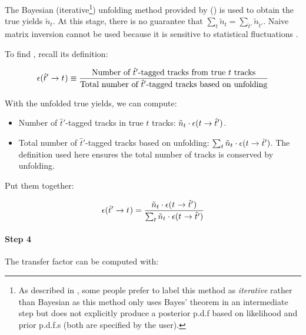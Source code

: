 The Bayesian (iterative\footnote{
    As described in \cite{StatisticalMethods},
    some people prefer to label this method as \emph{iterative} rather
    than Bayesian as this method only uses Bayes' theorem in an intermediate
    step but does not explicitly produce a posterior p.d.f based on
    likelihood and prior p.d.f.s (both are specified by the user).
}) unfolding method provided by \RooUnfold
(\cite{doi:10.1142/S0217751X20501456})
is used to obtain the true yields $\tilde{n}_t$.
At this stage, there is no guarantee that
$\sum_t \tilde{n}_t = \sum_{\hat{t}'} \tilde{n}_{\hat{t}'}$.
Naive matrix inversion cannot be used because it is sensitive to statistical
fluctuations \cite{Cowan_1998}.

To find , recall its definition:

\begin{equation}
    \misEff[\hat{t}']{t^{\phantom{}}} \equiv
        \frac{
            \text{Number of $\hat{t}'$-tagged tracks from true $t$ tracks}
        }{
            \text{Total number of $\hat{t}'$-tagged tracks based on unfolding}
        }
\end{equation}

With the unfolded true yields, we can compute:

\begin{itemize}
    \item Number of $\hat{t}'$-tagged tracks in true $t$ tracks:
        $\tilde{n}_t \cdot \misEff[t]{\hat{t}'}$.
    \item Total number of $\hat{t}'$-tagged tracks based on unfolding:
        $\sum_t \tilde{n}_t \cdot \misEff[t]{\hat{t}'}$.
        The definition used here ensures the total number of tracks is
        conserved by unfolding.
\end{itemize}

Put them together:

\begin{equation}
    \misEff[\hat{t}']{t^{\phantom{}}} =
        \frac{
            \tilde{n}_t \cdot \misEff[t^{\phantom{}}]{\hat{t}'}
        }{
            \sum_t \tilde{n}_t \cdot \misEff[t^{\phantom{}}]{\hat{t}'}
        }
\end{equation}

\paragraph{Step 4}
The transfer factor \misEff[\hat{t}']{\hat{\mu}}
can be computed with:

